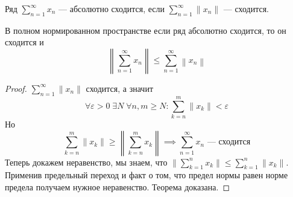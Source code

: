 \begin{conj}
  Ряд $\sum\limits_{n = 1}^{\infty} x_n$ --- абсолютно сходится, если
  $\sum\limits_{n = 1}^{\infty} \|x_n\|$ --- сходится.
\end{conj}

\begin{theorem}
  В полном нормированном пространстве если ряд абсолютно сходится, то он сходится и
  \begin{equation*}
    \left\|\sum\limits_{n = 1}^{\infty} x_n\right\| \leq
    \sum\limits_{n = 1}^{\infty}\left\|x_n\right\|
  \end{equation*}
\end{theorem}
\begin{proof}
  $\sum\limits_{n = 1}^{\infty}\|x_n\|$ сходится, а значит
  \begin{equation*}
    \forall \varepsilon > 0 \; \exists N \; \forall n, m \geq N\colon \sum\limits_{k = n}^{m} \|x_k\| < \varepsilon
  \end{equation*}
  Но
  \begin{equation*}
    \sum\limits_{k = n}^{m} \| x_k \| \geq \left\| \sum\limits_{k = n}^{m} x_k \right\| \implies
  \sum\limits_{n = 1}^{\infty} x_n\text{ --- сходится}
  \end{equation*}
  Теперь докажем неравенство, мы знаем, что $\Big \| \sum\limits_{k = 1}^{n} x_k \Big \| \leq \sum\limits_{k = 1}^{n} \| x_k \|$. Применив предельный переход и факт о том, что предел нормы равен норме предела получаем нужное неравенство. Теорема доказана.
\end{proof}

